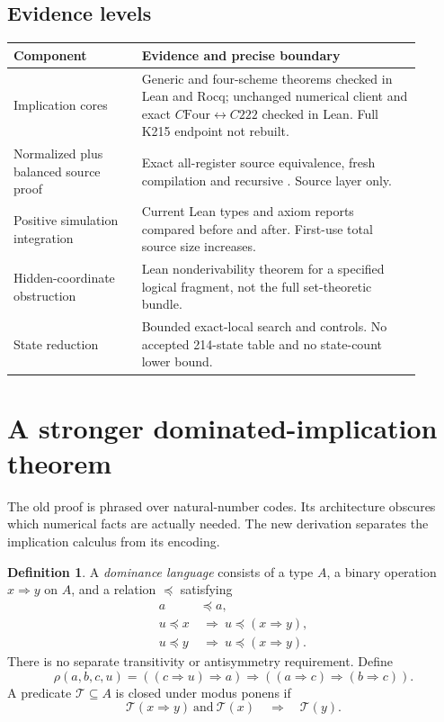 \documentclass[11pt]{article}
\theoremstyle{definition}\newtheorem{definition}[theorem]{Definition}
\newcommand{\impop}{\mathbin{\Rightarrow}}
\newcommand{\Rho}[4]{\rho(#1,#2,#3,#4)}
\newcommand{\T}{\mathcal T}
\newcommand{\code}[1]{\texttt{\detokenize{#1}}}
\begin{document}
\subsection{Evidence levels}
\begin{center}
\begin{tabular}{P{0.29\linewidth}P{0.61\linewidth}}
\toprule
Component & Evidence and precise boundary\\
\midrule
Implication cores & Generic and four-scheme theorems checked in Lean and Rocq; unchanged numerical client and exact $C\mathrm{Four}\leftrightarrow C222$ checked in Lean. Full K215 endpoint not rebuilt.\\
Normalized plus balanced source proof & Exact all-register source equivalence, fresh compilation and recursive \code{coqchk}. Source layer only.\\
Positive simulation integration & Current Lean types and axiom reports compared before and after. First-use total source size increases.\\
Hidden-coordinate obstruction & Lean nonderivability theorem for a specified logical fragment, not the full set-theoretic bundle.\\
State reduction & Bounded exact-local search and controls. No accepted 214-state table and no state-count lower bound.\\
\bottomrule
\end{tabular}
\end{center}

\section{A stronger dominated-implication theorem}
\label{sec:abstract}
The old proof is phrased over natural-number codes. Its architecture obscures which numerical facts are actually needed. The new derivation separates the implication calculus from its encoding.

\begin{definition}
A \emph{dominance language} consists of a type $A$, a binary operation $x\impop y$ on $A$, and a relation $\preceq$ satisfying
\begin{align}
 a&\preceq a,\\
 u\preceq x&\ \Longrightarrow\ u\preceq(x\impop y),\\
 u\preceq y&\ \Longrightarrow\ u\preceq(x\impop y).
\end{align}
There is no separate transitivity or antisymmetry requirement. Define
\[
\Rho{a}{b}{c}{u}
 =((c\impop u)\impop a)\impop((a\impop c)\impop(b\impop c)).
\]
A predicate $\T\subseteq A$ is closed under modus ponens if
\[
 \T(x\impop y)\ \text{and}\ \T(x)\quad\Longrightarrow\quad\T(y).
\]
\end{definition}
\end{document}
